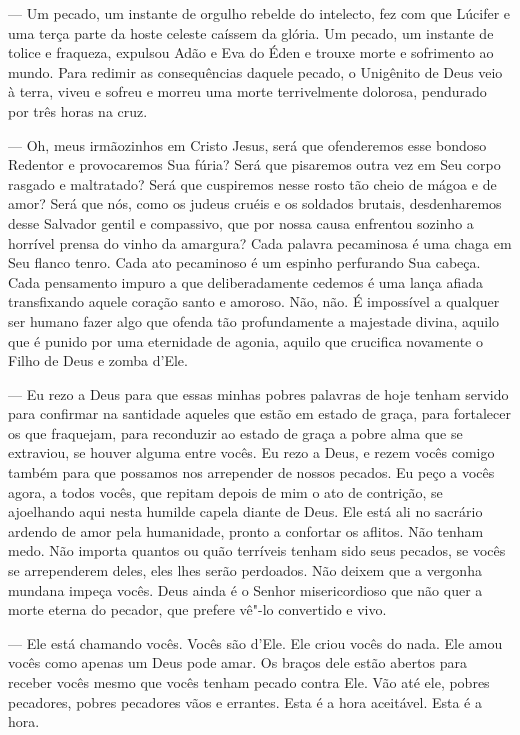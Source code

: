  --- Um pecado, um instante de orgulho rebelde do intelecto, fez com que
Lúcifer e uma terça parte da hoste celeste caíssem da glória. Um
pecado, um instante de tolice e fraqueza, expulsou Adão e Eva do Éden e
trouxe morte e sofrimento ao mundo. Para redimir as consequências
daquele pecado, o Unigênito de Deus veio à terra, viveu e sofreu e
morreu uma morte terrivelmente dolorosa, pendurado por três horas na
cruz.

 --- Oh, meus irmãozinhos em Cristo Jesus, será que ofenderemos esse
bondoso Redentor e provocaremos Sua fúria? Será que pisaremos outra vez
em Seu corpo rasgado e maltratado? Será que cuspiremos nesse rosto tão
cheio de mágoa e de amor? Será que nós, como os judeus cruéis e os
soldados brutais, desdenharemos desse Salvador gentil e compassivo, que
por nossa causa enfrentou sozinho a horrível prensa do vinho da
amargura? Cada palavra pecaminosa é uma chaga em Seu flanco tenro. Cada
ato pecaminoso é um espinho perfurando Sua cabeça. Cada pensamento
impuro a que deliberadamente cedemos é uma lança afiada transfixando
aquele coração santo e amoroso. Não, não. É impossível a qualquer ser
humano fazer algo que ofenda tão profundamente a majestade divina,
aquilo que é punido por uma eternidade de agonia, aquilo que crucifica
novamente o Filho de Deus e zomba d’Ele.

 --- Eu rezo a Deus para que essas minhas pobres palavras de hoje tenham
servido para confirmar na santidade aqueles que estão em estado de
graça, para fortalecer os que fraquejam, para reconduzir ao estado de
graça a pobre alma que se extraviou, se houver alguma entre vocês. Eu
rezo a Deus, e rezem vocês comigo também para que possamos nos
arrepender de nossos pecados. Eu peço a vocês agora, a todos vocês, que
repitam depois de mim o ato de contrição, se ajoelhando aqui nesta
humilde capela diante de Deus. Ele está ali no sacrário ardendo de amor
pela humanidade, pronto a confortar os aflitos. Não tenham medo. Não
importa quantos ou quão terríveis tenham sido seus pecados, se vocês se
arrependerem deles, eles lhes serão perdoados. Não deixem que a vergonha
mundana impeça vocês. Deus ainda é o Senhor misericordioso que não quer
a morte eterna do pecador, que prefere vê"-lo convertido e vivo.

 --- Ele está chamando vocês. Vocês são d’Ele. Ele criou
vocês do nada. Ele amou vocês como apenas um Deus pode amar. Os braços
dele estão abertos para receber vocês mesmo que vocês tenham pecado
contra Ele. Vão até ele, pobres pecadores, pobres pecadores vãos e
errantes. Esta é a hora aceitável. Esta é a hora.

